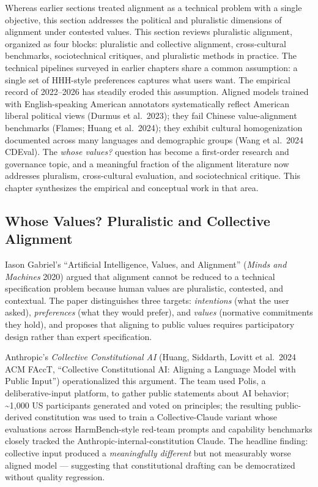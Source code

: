 Whereas earlier sections treated alignment as a technical problem with a single objective, this section addresses the political and pluralistic dimensions of alignment under contested values. This section reviews pluralistic alignment, organized as four blocks: pluralistic and collective alignment, cross-cultural benchmarks, sociotechnical critiques, and pluralistic methods in practice. The technical pipelines surveyed in earlier chapters share a common assumption: a single set of HHH-style preferences captures what users want. The empirical record of 2022--2026 has steadily eroded this assumption. Aligned models trained with English-speaking American annotators systematically reflect American liberal political views (Durmus et al.~2023); they fail Chinese value-alignment benchmarks (Flames; Huang et al.~2024); they exhibit cultural homogenization documented across many languages and demographic groups (Wang et al.~2024 CDEval). The \emph{whose values?} question has become a first-order research and governance topic, and a meaningful fraction of the alignment literature now addresses pluralism, cross-cultural evaluation, and sociotechnical critique. This chapter synthesizes the empirical and conceptual work in that area.

\subsection{Whose Values? Pluralistic and Collective Alignment}\label{whose-values-pluralistic-and-collective-alignment}

Iason Gabriel's ``Artificial Intelligence, Values, and Alignment'' (\emph{Minds and Machines} 2020) argued that alignment cannot be reduced to a technical specification problem because human values are pluralistic, contested, and contextual. The paper distinguishes three targets: \emph{intentions} (what the user asked), \emph{preferences} (what they would prefer), and \emph{values} (normative commitments they hold), and proposes that aligning to public values requires participatory design rather than expert specification.

Anthropic's \emph{Collective Constitutional AI} (Huang, Siddarth, Lovitt et al.~2024 ACM FAccT, ``Collective Constitutional AI: Aligning a Language Model with Public Input'') operationalized this argument. The team used Polis, a deliberative-input platform, to gather public statements about AI behavior; \textasciitilde1,000 US participants generated and voted on principles; the resulting public-derived constitution was used to train a Collective-Claude variant whose evaluations across HarmBench-style red-team prompts and capability benchmarks closely tracked the Anthropic-internal-constitution Claude. The headline finding: collective input produced a \emph{meaningfully different} but not measurably worse aligned model --- suggesting that constitutional drafting can be democratized without quality regression.

